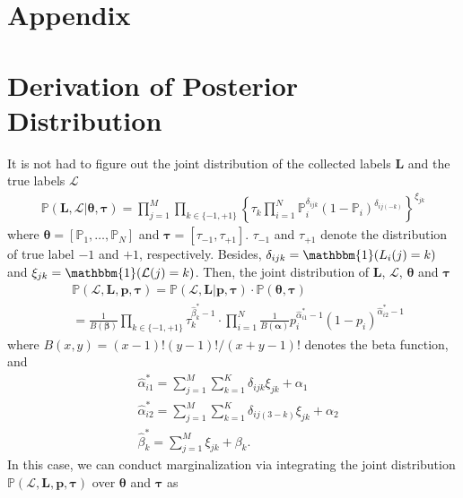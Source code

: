 \documentclass{article}
\begin{document}
\renewcommand{\thesection}{\Alph{section}}
\setcounter{section}{0}
\section*{Appendix}
\section{Derivation of Posterior Distribution}
It is not had to figure out the joint distribution of the collected labels $\bm{L}$ and the true labels $\mathcal{L}$ 
\begin{equation}
\label{JointDist}
\begin{split}
    \mathbb{P}(\bm{L}, \mathcal{L}| \bm{\theta}, \bm{\tau})={\prod}_{j=1}^{M}{\prod}_{k\in \{-1,+1\}}\left\{\tau_{k}\prod_{i=1}^{N}\mathbb{P}_i^{\delta_{ijk}}(1-\mathbb{P}_i)^{\delta_{ij(-k)}} \right\}^{\xi_{jk}}
\end{split}
\end{equation}
where $\bm{\theta}=[\mathbb{P}_1,\ldots, \mathbb{P}_N]$ and $\bm{\tau}=[\tau_{-1},\tau_{+1}]$. $\tau_{-1}$ and $\tau_{+1}$ denote the distribution of true label $-1$ and $+1$, respectively.
Besides,  $\delta_{ijk}=\mathbbm{1}(L_i(j)=k)$ and $\xi_{jk}= \mathbbm{1}(\mathcal{L}(j)=k)$.
Then, the joint distribution of $\bm{L}$, $\mathcal{L}$, $\bm{\theta}$ and $\bm{\tau}$ 
\begin{equation}
\label{JointDist2}
\begin{split}
&\mathbb{P}(\mathcal{L},\bm{L},\bm{p}, \bm{\tau})=\mathbb{P}(\mathcal{L},\bm{L}|\bm{p}, \bm{\tau})\cdot \mathbb{P}(\bm{\theta}, \bm{\tau})\\
&=\frac{1}{B(\bm{\beta})}\prod_{k\in \{-1,+1\}}\tau_k^{\hat{\beta}^{*}_k-1}\cdot\prod_{i=1}^{N}\frac{1}{B(\bm{\alpha})}p_i^{\hat{\alpha}^{*}_{i1}-1}(1-p_i)^{\hat{\alpha}^{*}_{i2}-1}
\end{split}
\end{equation}
where $B(x,y)=(x-1)!(y-1)!/(x+y-1)!$ denotes the beta function, and
\begin{equation*}
\begin{split}
&\hat{\alpha}^{*}_{i1}={\sum}_{j=1}^{M}{\sum}_{k=1}^{K}\delta_{ijk}\xi_{jk}+\alpha_{1}\\
&\hat{\alpha}^{*}_{i2}={\sum}_{j=1}^{M}{\sum}_{k=1}^{K}\delta_{ij(3-k)}\xi_{jk}+\alpha_{2}\\
&\hat{\beta}^{*}_k={\sum}_{j=1}^{M}\xi_{jk}+\beta_{k}.
\end{split}
\end{equation*}
In this case, we can conduct marginalization via integrating the joint distribution $\mathbb{P}(\mathcal{L},\bm{L},\bm{p}, \bm{\tau})$ over $\bm{\theta}$ and $\bm{\tau}$ as
\end{document}
